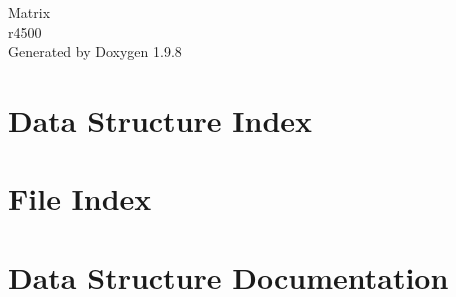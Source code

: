 \documentclass[twoside]{book}
\newcommand{\+}{\discretionary{\mbox{\scriptsize$\hookleftarrow$}}{}{}}
\newcommand{\clearemptydoublepage}{%
    \newpage{\pagestyle{empty}\cleardoublepage}%
  }
\begin{document}
  \raggedbottom
    \hypersetup{pageanchor=false,
                bookmarksnumbered=true,
                pdfencoding=unicode
               }
  \begin{titlepage}
  \vspace*{7cm}
  \begin{center}%
  {\Large Matrix}\\
  [1ex]\large r4500 \\
  \vspace*{1cm}
  {\large Generated by Doxygen 1.9.8}\\
  \end{center}
  \end{titlepage}
  \clearemptydoublepage
  \tableofcontents
  \clearemptydoublepage
  \hypersetup{pageanchor=true}
\chapter{Data Structure Index}

\chapter{File Index}

\chapter{Data Structure Documentation}








\end{document}

